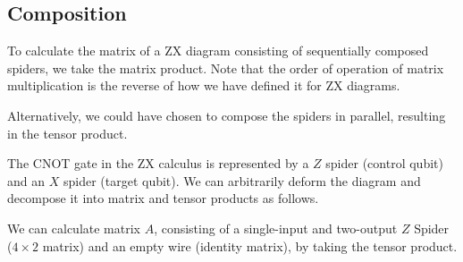 
\subsection{Composition}%
\label{composition}

To calculate the matrix of a ZX diagram consisting of sequentially composed spiders, we take the matrix product. Note that the order of operation of matrix multiplication is the reverse of how we have defined it for ZX diagrams.


Alternatively, we could have chosen to compose the spiders in parallel, resulting in the tensor product.


The CNOT gate in the ZX calculus is represented by a $Z$ spider (control qubit) and an $X$ spider (target qubit). We can arbitrarily deform the diagram and decompose it into matrix and tensor products as follows.


We can calculate matrix $A$, consisting of a single-input and two-output $Z$ Spider ($4 \times 2$ matrix) and an empty wire (identity matrix), by taking the tensor product.


